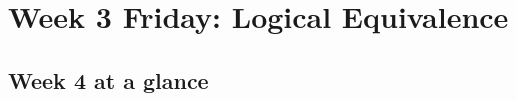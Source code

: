 \section*{Week 3 Friday: Logical Equivalence}


\vfill

\vfill

\vfill


\newpage

\subsection*{Week 4 at a glance}

